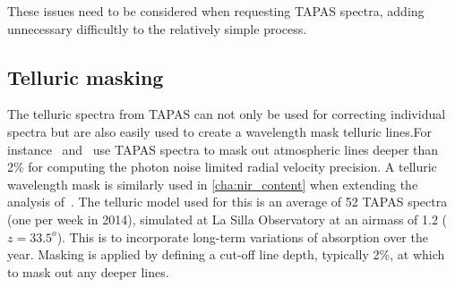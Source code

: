 These issues need to be considered when requesting {TAPAS} spectra, adding unnecessary difficultly to the relatively simple process.


\subsection{Telluric masking}
The telluric spectra from {TAPAS} can not only be used for correcting individual spectra but are also easily used to create a wavelength mask telluric lines.For instance~\citet{figueira_radial_2016} and~\citet{artigau_optical_2018} use {TAPAS} spectra to mask out atmospheric lines deeper than 2\% for computing the photon noise limited radial velocity precision.
A telluric wavelength mask is similarly used in \cref{cha:nir_content} when extending the analysis of~\citet{figueira_radial_2016}.
The telluric model used for this is an average of 52 {TAPAS} spectra (one per week in 2014), simulated at La Silla Observatory at an airmass of 1.2 (\(z = 33.5^{o}\)).
This is to incorporate long-term variations of absorption over the year.
Masking is applied by defining a cut-off line depth, typically 2\%, at which to mask out any deeper lines.
